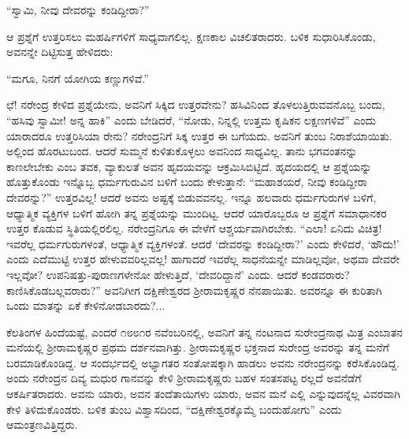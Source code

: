 “ಸ್ವಾಮಿ, ನೀವು ದೇವರನ್ನು ಕಂಡಿದ್ದೀರಾ?”

ಆ ಪ್ರಶ್ನೆಗೆ ಉತ್ತರಿಸಲು ಮಹರ್ಷಿಗಳಿಗೆ ಸಾಧ್ಯವಾಗಲಿಲ್ಲ. ಕ್ಷಣಕಾಲ ವಿಚಲಿತರಾದರು. ಬಳಿಕ ಸುಧಾರಿಸಿಕೊಂಡು, ಅವನನ್ನೇ ದಿಟ್ಟಿಸುತ್ತ ಹೇಳಿದರು:

“ಮಗೂ, ನಿನಗೆ ಯೋಗಿಯ ಕಣ್ಣುಗಳಿವೆ.”

ಛೆ! ನರೇಂದ್ರ ಕೇಳಿದ ಪ್ರಶ್ನೆಯೇನು, ಅವನಿಗೆ ಸಿಕ್ಕಿದ ಉತ್ತರವೇನು? ಹಸಿವಿನಿಂದ ತೊಳಲುತ್ತಿರುವವನೊಬ್ಬ ಬಂದು, “ಹಸಿವು ಸ್ವಾಮೀ! ಅನ್ನ ಹಾಕಿ” ಎಂದು ಬೇಡಿದರೆ, “ನೋಡು, ನಿನ್ನಲ್ಲಿ ಉತ್ತಮ ಕೃಷಿಕನ ಲಕ್ಷಣಗಳಿವೆ” ಎಂದು ಯಾರಾದರೂ ಉತ್ತರಿಸಿಯಾ ರೇನು? ನರೇಂದ್ರನಿಗೆ ಸಿಕ್ಕ ಉತ್ತರ ಈ ಬಗೆಯದು. ಅವನಿಗೆ ತುಂಬ ನಿರಾಶೆಯಾಯಿತು. ಅಲ್ಲಿಂದ ಹೊರಟುಬಂದ. ಆದರೆ ಸುಮ್ಮನೆ ಕುಳಿತುಕೊಳ್ಳಲು ಅವನಿಂದ ಸಾಧ್ಯವಿಲ್ಲ. ತಾನು ಭಗವಂತನನ್ನು ಕಾಣಲೇಬೇಕು ಎಂಬ ತವಕ, ವ್ಯಾಕುಲತೆ ಅವನ ಹೃದಯವನ್ನು ಆಕ್ರಮಿಸಿಬಿಟ್ಟಿದೆ. ಹೃದಯದಲ್ಲಿ ಆ ಪ್ರಶ್ನೆಯನ್ನು ಹೊತ್ತುಕೊಂಡು ಇನ್ನೊಬ್ಬ ಧರ್ಮಗುರುವಿನ ಬಳಿಗೆ ಬಂದು ಕೇಳುತ್ತಾನೆ: “ಮಹಾಶಯರೆ, ನೀವು ಕಂಡಿದ್ದೀರಾ ದೇವರನ್ನು?” ಉತ್ತರವಿಲ್ಲ! ಆದರೆ ಅವನು ಅಷ್ಟಕ್ಕೆ ಬಿಡುವವನಲ್ಲ. ಇನ್ನೂ ಹಲವಾರು ಧರ್ಮಗುರುಗಳ ಬಳಿಗೆ, ಆಧ್ಯಾತ್ಮಿಕ ವ್ಯಕ್ತಿಗಳ ಬಳಿಗೆ ಹೋಗಿ ತನ್ನ ಪ್ರಶ್ನೆಯನ್ನು ಮುಂದಿಟ್ಟ. ಆದರೆ ಯಾರೊಬ್ಬರೂ ಆ ಪ್ರಶ್ನೆಗೆ ಸಮಾಧಾನಕರ ಉತ್ತರ ಕೊಡುವ ಸ್ಥಿತಿಯಲ್ಲಿರಲಿಲ್ಲ. ನರೇಂದ್ರನಿಗೂ ಈ ವೇಳೆಗೆ ಆಶ್ಚರ್ಯವಾಗಿರಬೇಕು. “ಎಲಾ! ಏನಿದು ವಿಚಿತ್ರ! ಇವರೆಲ್ಲ ಧರ್ಮಗುರುಗಳಂತೆ, ಆಧ್ಯಾತ್ಮಿಕ ವ್ಯಕ್ತಿಗಳಂತೆ. ಆದರೆ ‘ದೇವರನ್ನು ಕಂಡಿದ್ದೀರಾ?’ ಎಂದು ಕೇಳಿದರೆ, ‘ಹೌದು!’ ಎಂದು ಎದೆಮುಟ್ಟಿ ಉತ್ತರ ಹೇಳುವವರಿಲ್ಲವಲ್ಲ! ಹಾಗಾದರೆ ಇವರೆಲ್ಲ ಸಾಧನೆಯನ್ನೇ ಮಾಡಿಲ್ಲವೋ, ಅಥವಾ ದೇವರೇ ಇಲ್ಲವೋ? ಉಪನಿಷತ್ತು-ಪುರಾಣಗಳೇನೋ ಹೇಳುತ್ತಿದೆ, ‘ದೇವರಿದ್ದಾನೆ’ ಎಂದು. ಆದರೆ ಕಂಡವರಾರು? ಕಾಣಿಸಿಕೊಡಬಲ್ಲವರಾರು?” ಅವನಿಗೀಗ ದಕ್ಷಿಣೇಶ್ವರದ ಶ್ರೀರಾಮಕೃಷ್ಣರ ನೆನಪಾಯಿತು. ಅವರನ್ನೂ ಈ ಕುರಿತಾಗಿ ಒಂದು ಮಾತನ್ನು ಏಕೆ ಕೇಳಿನೋಡಬಾರದು?...

ಕೆಲತಿಂಗಳ ಹಿಂದೆಯಷ್ಟೆ, ಎಂದರೆ ೧೮೮೧ರ ನವೆಂಬರಿನಲ್ಲಿ, ಅವನಿಗೆ ತನ್ನ ನಂಟನಾದ ಸುರೇಂದ್ರನಾಥ ಮಿತ್ರ ಎಂಬಾತನ ಮನೆಯಲ್ಲಿ ಶ್ರೀರಾಮಕೃಷ್ಣರ ಪ್ರಥಮ ದರ್ಶನವಾಗಿತ್ತು. ಶ್ರೀರಾಮಕೃಷ್ಣರ ಭಕ್ತನಾದ ಸುರೇಂದ್ರ ಅವರನ್ನು ತನ್ನ ಮನೆಗೆ ಬರಮಾಡಿಕೊಂಡಿದ್ದ. ಆ ಸಂದರ್ಭದಲ್ಲಿ ಅಭ್ಯಾಗತರ ಸಂತೋಷಕ್ಕಾಗಿ ಹಾಡಲು ಅವನು ನರೇಂದ್ರನನ್ನು ಕರೆಸಿಕೊಂಡಿದ್ದ. ಅಂದು ನರೇಂದ್ರನ ದಿವ್ಯ ಮಧುರ ಗಾನವನ್ನು ಕೇಳಿ ಶ್ರೀರಾಮಕೃಷ್ಣರು ಬಹಳ ಸಂತಸಪಟ್ಟ ರಲ್ಲದೆ ಅವನೆಡೆಗೆ ಆಕರ್ಷಿತರಾದರು. ಅವನು ಯಾರು, ಅವನ ತಂದೆತಾಯಿಗಳು ಯಾರು, ಅವನ ಮನೆ ಎಲ್ಲಿ ಎನ್ನುವುದನ್ನೆಲ್ಲ ವಿವರವಾಗಿ ಕೇಳಿ ತಿಳಿದುಕೊಂಡರು. ಬಳಿಕ ತುಂಬ ವಿಶ್ವಾಸದಿಂದ, “ದಕ್ಷಿಣೇಶ್ವರಕ್ಕೊಮ್ಮೆ ಬಂದುಹೋಗು” ಎಂದು ಆಮಂತ್ರಣವಿತ್ತಿದ್ದರು.

